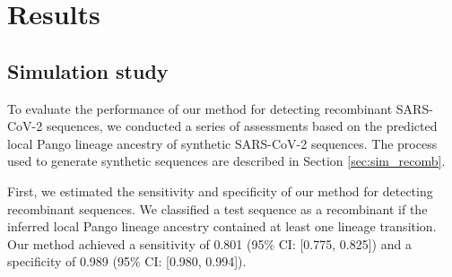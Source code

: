 \documentclass[11pt,oneside,letterpaper]{article}
\begin{document}






\section{Results}

\subsection{Simulation study}\label{sec:sim_res} 

To evaluate the performance of our method for detecting recombinant SARS-CoV-2 sequences, we conducted a series of assessments based on the predicted local Pango lineage ancestry of synthetic SARS-CoV-2 sequences. The process used to generate synthetic sequences are described in Section \ref{sec:sim_recomb}.

First, we estimated the sensitivity and specificity of our method for detecting recombinant sequences. We classified a test sequence as a recombinant if the inferred local Pango lineage ancestry contained at least one lineage transition. Our method achieved a sensitivity of 0.801 (95\% CI: [0.775, 0.825]) and a specificity of 0.989 (95\% CI: [0.980, 0.994]). 
\end{document}
